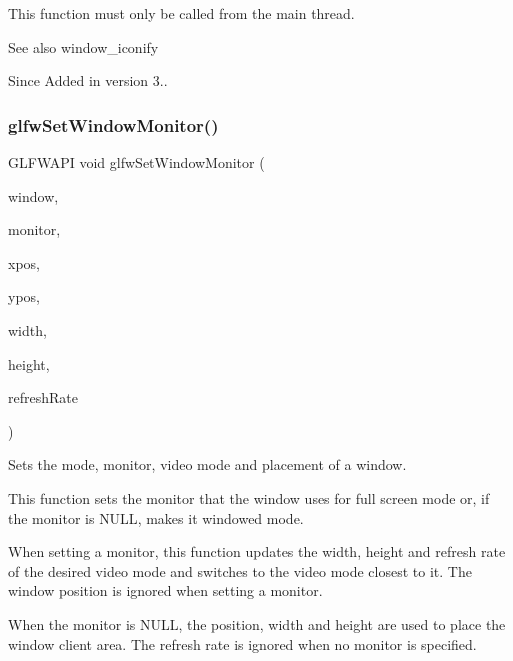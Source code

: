 This function must only be called from the main thread.

\begin{DoxySeeAlso}{See also}
window\+\_\+iconify
\end{DoxySeeAlso}
\begin{DoxySince}{Since}
Added in version 3.. 
\end{DoxySince}
\mbox{\label{group__window_ga12fabf78575e59c00f822f323ae0b6ae}} 
\subsubsection{\texorpdfstring{glfw\+Set\+Window\+Monitor()}{glfwSetWindowMonitor()}}
{\footnotesize\ttfamily G\+L\+F\+W\+A\+PI void glfw\+Set\+Window\+Monitor (\begin{DoxyParamCaption}\item[{\hyperlink{group__window_ga3c96d80d363e67d13a41b5d1821f3242}{G\+L\+F\+Wwindow} $\ast$}]{window,  }\item[{\hyperlink{group__monitor_ga8d9efd1cde9426692c73fe40437d0ae3}{G\+L\+F\+Wmonitor} $\ast$}]{monitor,  }\item[{int}]{xpos,  }\item[{int}]{ypos,  }\item[{int}]{width,  }\item[{int}]{height,  }\item[{int}]{refresh\+Rate }\end{DoxyParamCaption})}



Sets the mode, monitor, video mode and placement of a window. 

This function sets the monitor that the window uses for full screen mode or, if the monitor is {\ttfamily N\+U\+LL}, makes it windowed mode.

When setting a monitor, this function updates the width, height and refresh rate of the desired video mode and switches to the video mode closest to it. The window position is ignored when setting a monitor.

When the monitor is {\ttfamily N\+U\+LL}, the position, width and height are used to place the window client area. The refresh rate is ignored when no monitor is specified.

